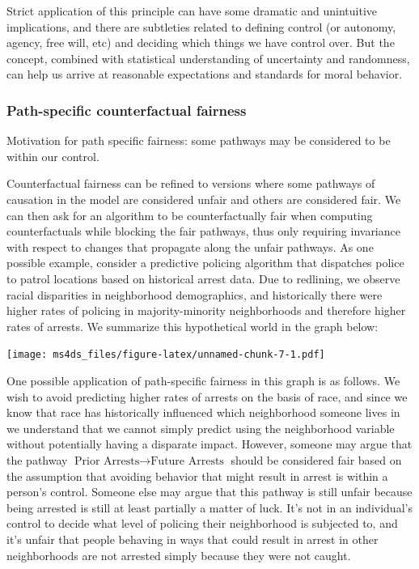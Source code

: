 \documentclass[]{book}
\theoremstyle{definition}
\theoremstyle{definition}
\theoremstyle{definition}
\theoremstyle{remark}
\begin{document}
Strict application of this principle can have some dramatic and
unintuitive implications, and there are subtleties related to defining
control (or autonomy, agency, free will, etc) and deciding which things
we have control over. But the concept, combined with statistical
understanding of uncertainty and randomness, can help us arrive at
reasonable expectations and standards for moral behavior.

\subsubsection{Path-specific counterfactual
fairness}\label{path-specific-counterfactual-fairness}

Motivation for path specific fairness: some pathways may be considered
to be within our control.

Counterfactual fairness can be refined to versions where some pathways
of causation in the model are considered unfair and others are
considered fair. We can then ask for an algorithm to be counterfactually
fair when computing counterfactuals while blocking the fair pathways,
thus only requiring invariance with respect to changes that propagate
along the unfair pathways. As one possible example, consider a
predictive policing algorithm that dispatches police to patrol locations
based on historical arrest data. Due to redlining, we observe racial
disparities in neighborhood demographics, and historically there were
higher rates of policing in majority-minority neighborhoods and
therefore higher rates of arrests. We summarize this hypothetical world
in the graph below:

\texttt{[image: ms4ds\_files/figure-latex/unnamed-chunk-7-1.pdf]}

One possible application of path-specific fairness in this graph is as
follows. We wish to avoid predicting higher rates of arrests on the
basis of race, and since we know that race has historically influenced
which neighborhood someone lives in we understand that we cannot simply
predict using the neighborhood variable without potentially having a
disparate impact. However, someone may argue that the pathway
\(\text{Prior Arrests} \to \text{Future Arrests}\) should be considered
fair based on the assumption that avoiding behavior that might result in
arrest is within a person's control. Someone else may argue that this
pathway is still unfair because being arrested is still at least
partially a matter of luck. It's not in an individual's control to
decide what level of policing their neighborhood is subjected to, and
it's unfair that people behaving in ways that could result in arrest in
other neighborhoods are not arrested simply because they were not
caught.
\end{document}
